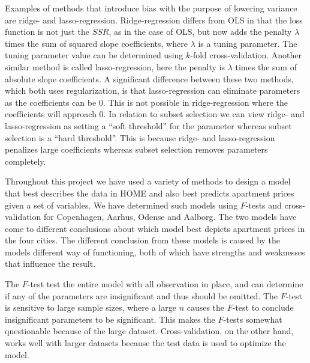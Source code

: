 
Examples of methods that introduce bias with the purpose of lowering variance are ridge- and lasso-regression.
Ridge-regression differs from OLS in that the loss function is not just the $SSR$, as in the case of OLS, but now adds the penalty $\lambda$ times the sum of squared slope coefficients, where $\lambda$ is a tuning parameter.
The tuning parameter value can be determined using $k$-fold cross-validation.
Another similar method is called lasso-regression, here the penalty is $\lambda$ times the sum of absolute slope coefficients.
A significant difference between these two methods, which both uses regularization, is that lasso-regression can eliminate parameters as the coefficients can be 0.
This is not possible in ridge-regression where the coefficients will approach 0.
In relation to subset selection we can view ridge- and lasso-regression as setting a ``soft threshold'' for the parameter whereas subset selection is a ``hard threshold''.
This is because ridge- and lasso-regression penalizes large coefficients whereas subset selection removes parameters completely.

Throughout this project we have used a variety of methods to design a model that best describes the data in HOME and also best predicts apartment prices given a set of variables. 
We have determined such models using $F$-tests and cross-validation for Copenhagen, Aarhus, Odense and Aalborg.
The two models have come to different conclusions about which model best depicts apartment prices in the four cities. 
The different conclusion from these models is caused by the models different way of functioning, both of which have strengths and weaknesses that influence the result.

The $F$-test test the entire model with all observation in place, and can determine if any of the parameters are insignificant and thus should be omitted.
The $F$-test is sensitive to large sample sizes, where a large $n$ causes the $F$-test to conclude insignificant parameters to be significant. 
This makes the $F$-tests somewhat questionable because of the large dataset. 
Cross-validation, on the other hand, works well with larger datasets because the test data is used to optimize the model. 

